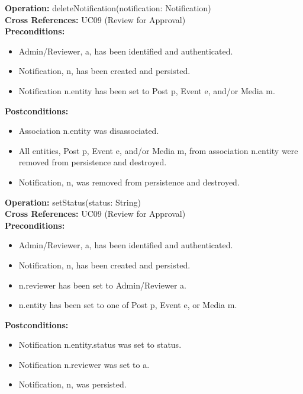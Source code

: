 \textbf{Operation:} deleteNotification(notification: Notification) \\
\textbf{Cross References:} UC09 (Review for Approval) \\
\textbf{Preconditions:}
\begin{itemize}
    \item Admin/Reviewer, a, has been identified and authenticated.
    \item Notification, n, has been created and persisted.
    \item Notification n.entity has been set to Post p, Event e, and/or Media m.
\end{itemize}
\textbf{Postconditions:}
\begin{itemize}
    \item Association n.entity was disassociated.
    \item All entities, Post p, Event e, and/or Media m, from association n.entity were removed from persistence and destroyed.
    \item Notification, n, was removed from persistence and destroyed.
\end{itemize}

\textbf{Operation:} setStatus(status: String) \\
\textbf{Cross References:} UC09 (Review for Approval) \\
\textbf{Preconditions:}
\begin{itemize}
    \item Admin/Reviewer, a, has been identified and authenticated.
    \item Notification, n, has been created and persisted.
    \item n.reviewer has been set to Admin/Reviewer a.
    \item n.entity has been set to one of Post p, Event e, or Media m.
\end{itemize}
\textbf{Postconditions:}
\begin{itemize}
    \item Notification n.entity.status was set to status.
    \item Notification n.reviewer was set to a.
    \item Notification, n, was persisted.
\end{itemize}
